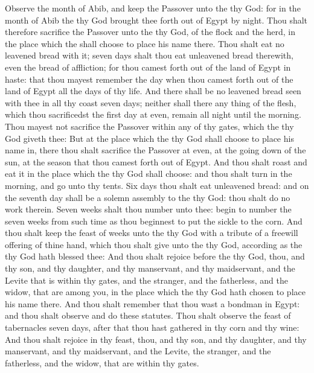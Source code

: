 \begin{biblechapter} %
 Observe the month of Abib, and keep the Passover unto the \LORD thy God: for in the month of Abib the \LORD thy God brought thee forth out of Egypt by night.
\verse Thou shalt therefore sacrifice the Passover unto the \LORD thy God, of the flock and the herd, in the place which the \LORD shall choose to place his name there.
\verse Thou shalt eat no leavened bread with it; seven days shalt thou eat unleavened bread therewith, even the bread of affliction; for thou camest forth out of the land of Egypt in haste: that thou mayest remember the day when thou camest forth out of the land of Egypt all the days of thy life.
\verse And there shall be no leavened bread seen with thee in all thy coast seven days; neither shall there any thing of the flesh, which thou sacrificedst the first day at even, remain all night until the morning.
\verse Thou mayest not sacrifice the Passover within any of thy gates, which the \LORD thy God giveth thee:
\verse But at the place which the \LORD thy God shall choose to place his name in, there thou shalt sacrifice the Passover at even, at the going down of the sun, at the season that thou camest forth out of Egypt.
\verse And thou shalt roast and eat it in the place which the \LORD thy God shall choose: and thou shalt turn in the morning, and go unto thy tents.
\verse Six days thou shalt eat unleavened bread: and on the seventh day shall be a solemn assembly to the \LORD thy God: thou shalt do no work therein.
 Seven weeks shalt thou number unto thee: begin to number the seven weeks from such time as thou beginnest to put the sickle to the corn.
\verse And thou shalt keep the feast of weeks unto the \LORD thy God with a tribute of a freewill offering of thine hand, which thou shalt give unto the \LORD thy God, according as the \LORD thy God hath blessed thee:
\verse And thou shalt rejoice before the \LORD thy God, thou, and thy son, and thy daughter, and thy manservant, and thy maidservant, and the Levite that is within thy gates, and the stranger, and the fatherless, and the widow, that are among you, in the place which the \LORD thy God hath chosen to place his name there.
\verse And thou shalt remember that thou wast a bondman in Egypt: and thou shalt observe and do these statutes.
 Thou shalt observe the feast of tabernacles seven days, after that thou hast gathered in thy corn and thy wine:
\verse And thou shalt rejoice in thy feast, thou, and thy son, and thy daughter, and thy manservant, and thy maidservant, and the Levite, the stranger, and the fatherless, and the widow, that are within thy gates.

\end{biblechapter}
